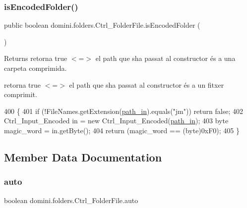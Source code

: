 \subsubsection{\texorpdfstring{is\+Encoded\+Folder()}{isEncodedFolder()}}
{\footnotesize\ttfamily public boolean domini.\+folders.\+Ctrl\+\_\+\+Folder\+File.\+is\+Encoded\+Folder (\begin{DoxyParamCaption}{ }\end{DoxyParamCaption})\hspace{0.3cm}{\ttfamily [inline]}}

\begin{DoxyReturn}{Returns}
retorna true $<$=$>$ el path que s\textquotesingle{}ha passat al constructor és a una carpeta comprimida.

retorna true $<$=$>$ el path que s\textquotesingle{}ha passat al constructor és a un fitxer comprimit. 
\end{DoxyReturn}

\begin{DoxyCode}
400                                      \{
401         \textcolor{keywordflow}{if} (!FileNames.getExtension(\hyperlink{classdomini_1_1folders_1_1Ctrl__FolderFile_a0d3946bb2832a1f34d0c2227df5c71c4}{path\_in}).equals(\textcolor{stringliteral}{"jm"})) \textcolor{keywordflow}{return} \textcolor{keyword}{false};
402         Ctrl\_Input\_Encoded in = \textcolor{keyword}{new} Ctrl\_Input\_Encoded(\hyperlink{classdomini_1_1folders_1_1Ctrl__FolderFile_a0d3946bb2832a1f34d0c2227df5c71c4}{path\_in});
403         byte magic\_word = in.getByte();
404         \textcolor{keywordflow}{return} (magic\_word == (byte)0xF0);
405     \}
\end{DoxyCode}


\subsection{Member Data Documentation}
\mbox{\label{classdomini_1_1folders_1_1Ctrl__FolderFile_a522ecbf2a1426984671134e062491b75}} 
\subsubsection{\texorpdfstring{auto}{auto}}
{\footnotesize\ttfamily boolean domini.\+folders.\+Ctrl\+\_\+\+Folder\+File.\+auto\hspace{0.3cm}{\ttfamily [private]}}


